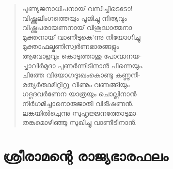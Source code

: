 \begin{verse}
പുണ്യജനാധിപനായ് വസിച്ചീടെടോ!\\
വിഷ്ണുലിംഗത്തെയും പൂജിച്ചു നിത്യവും\\
വിഷ്ണുപരായണനായ് വിശുദ്ധാത്മനാ\\
മുക്തനായ് വാണീടുകെ’ന്നു നിയോഗിച്ചു\\
മുക്താഫല്മണിസ്വര്‍ണഭാരങ്ങളും\\
ആവോളവും കൊടുത്താശു പോവാനയ-\\
ച്ചാവിര്‍മുദാ പുണര്‍ന്നീടിനാന്‍ പിന്നെയും.\\
ചിത്തേ വിയോഗദുഃഖംകൊണ്ടു കണ്ണുനീ-\\
രത്യര്‍ത്ഥമിറ്റിറ്റു വീണും വണങ്ങിയും\\
ഗദ്ഗദവര്‍ണേന യാത്രയും ചൊല്ലിനാന്‍\\
നിര്‍ഗമിച്ചാനൊരുജാതി വിഭീഷണന്‍.\\
ലങ്കയില്‍ച്ചെന്നു സുഹൃജ്ജനത്തോടുമാ-\\
തങ്കമൊഴിഞ്ഞു സുഖിച്ചു വാണീടിനാന്‍.
\end{verse}

\newpage

\section{ശ്രീരാമന്റെ രാജ്യഭാരഫലം}

